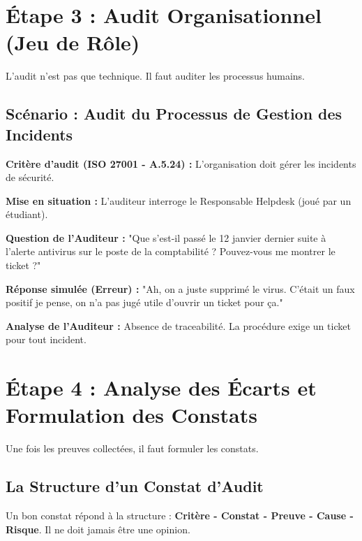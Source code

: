 \section{Étape 3 : Audit Organisationnel (Jeu de Rôle)}

L'audit n'est pas que technique. Il faut auditer les processus humains.

\subsection{Scénario : Audit du Processus de Gestion des Incidents}

\textbf{Critère d'audit (ISO 27001 - A.5.24) :} L'organisation doit gérer les incidents de sécurité.

\begin{boxlizbiz}
\textbf{Mise en situation :}
L'auditeur interroge le Responsable Helpdesk (joué par un étudiant).

\textbf{Question de l'Auditeur :} "Que s'est-il passé le 12 janvier dernier suite à l'alerte antivirus sur le poste de la comptabilité ? Pouvez-vous me montrer le ticket ?"

\textbf{Réponse simulée (Erreur) :} "Ah, on a juste supprimé le virus. C'était un faux positif je pense, on n'a pas jugé utile d'ouvrir un ticket pour ça."

\textbf{Analyse de l'Auditeur :}
Absence de traceabilité. La procédure exige un ticket pour tout incident.
\end{boxlizbiz}

\section{Étape 4 : Analyse des Écarts et Formulation des Constats}

Une fois les preuves collectées, il faut formuler les constats.

\subsection{La Structure d'un Constat d'Audit}

Un bon constat répond à la structure : \textbf{Critère - Constat - Preuve - Cause - Risque}. Il ne doit jamais être une opinion.

